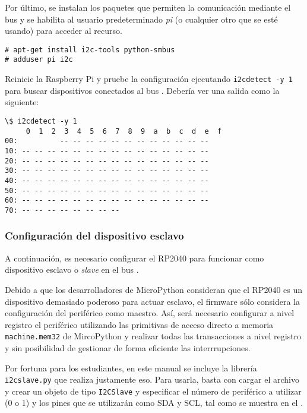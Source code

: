 Por último, se instalan los paquetes que permiten la comunicación mediante el bus \IIC y se habilita al usuario predeterminado \emph{pi} (o cualquier otro que se esté usando) para acceder al recurso.

\begin{Verbatim}
# apt-get install i2c-tools python-smbus
# adduser pi i2c
\end{Verbatim}

Reinicie la Raspberry Pi y pruebe la configuración ejecutando \texttt{i2cdetect -y 1} para buscar dispositivos conectados al bus \IIC.
Debería ver una salida como la siguiente:

\begin{Verbatim}
\$ i2cdetect -y 1
     0  1  2  3  4  5  6  7  8  9  a  b  c  d  e  f
00:          -- -- -- -- -- -- -- -- -- -- -- --
10: -- -- -- -- -- -- -- -- -- -- -- -- -- -- --
20: -- -- -- -- -- -- -- -- -- -- -- -- -- -- --
30: -- -- -- -- -- -- -- -- -- -- -- -- -- -- --
40: -- -- -- -- -- -- -- -- -- -- -- -- -- -- --
50: -- -- -- -- -- -- -- -- -- -- -- -- -- -- --
60: -- -- -- -- -- -- -- -- -- -- -- -- -- -- --
70: -- -- -- -- -- -- -- --
\end{Verbatim}


\subsubsection*{Configuración del dispositivo esclavo}

A continuación, es necesario configurar el RP2040 para funcionar como dispositivo esclavo o \emph{slave} en el bus \IIC.

Debido a que los desarrolladores de MicroPython consideran que el RP2040 es un dispositivo demasiado poderoso para actuar esclavo,
el firmware sólo considera la configuración del periférico como maestro.
Así, será necesario configurar a nivel registro el periférico utilizando las primitivas de acceso directo a memoria \texttt{machine.mem32} de MircoPython y realizar todas las transacciones a nivel registro y sin posibilidad de gestionar de forma eficiente las interrrupciones.

Por fortuna para los estudiantes, en este manual se incluye la librería \texttt{i2cslave.py} que realiza justamente eso.
Para usarla, basta con cargar el archivo y crear un objeto de tipo \texttt{I2CSlave} y especificar el número de periférico a utilizar (\IIC{}0 o \IIC{}1) y los pines que se utilizarán como SDA y SCL, tal como se muestra en el .

